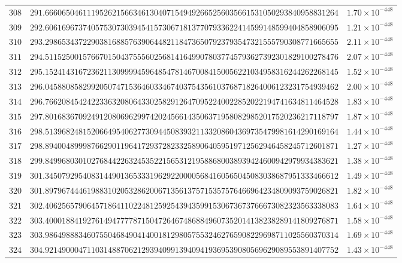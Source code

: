 \documentclass[12pt,reqno]{amsart}
\theoremstyle{remark}
\begin{document}
\begin{longtable}{clc}
$308$ & $291.6660650461119526215663461304071549492665256035661531050293840958831264$ & $1.70\times 10^{-448}$ \\
$309$ & $292.6061696737405753073039454157306718137707933622414599148599404858906095$ & $1.21\times 10^{-448}$ \\
$310$ & $293.2986534372290381688576390644821184736507923793547321555790308771665655$ & $2.11\times 10^{-448}$ \\
$311$ & $294.5115250015766701504375556025681416499078037745793627392301829100278476$ & $2.07\times 10^{-448}$ \\
$312$ & $295.1524143167236211309999459648547814670084150056221034958316244262268145$ & $1.52\times 10^{-448}$ \\
$313$ & $296.0458808582992050747153646033467403754356103768718264006123231754939462$ & $2.00\times 10^{-448}$ \\
$314$ & $296.7662084542422336320806433025829126470952240022852022194741634811464528$ & $1.83\times 10^{-448}$ \\
$315$ & $297.8016836709249120806962997420245661435063719580829852017520236217118797$ & $1.87\times 10^{-448}$ \\
$316$ & $298.5139682481520664954062773094450839321133208604369735479981614290169164$ & $1.44\times 10^{-448}$ \\
$317$ & $298.8940048999876629011964172937282332589064059519712562946458245712601871$ & $1.27\times 10^{-448}$ \\
$318$ & $299.8499680301027684422632453522156531219588680038939424600942979934383621$ & $1.38\times 10^{-448}$ \\
$319$ & $301.3450792954083144901365333196292200005684160565045083038687951333466612$ & $1.49\times 10^{-448}$ \\
$320$ & $301.8979674446198831020532862006713561375715357576466964234809093759026821$ & $1.82\times 10^{-448}$ \\
$321$ & $302.4062565790645718641102248125925439435991530673673766673082323563338083$ & $1.64\times 10^{-448}$ \\
$322$ & $303.4000188419276149477778715047264674868849607352014138238289141809276871$ & $1.58\times 10^{-448}$ \\
$323$ & $303.9864988834607550468490414001812980575532462765908229698711025560370314$ & $1.69\times 10^{-448}$ \\
$324$ & $304.9214900047110314887062129394099139409419369539080569629089553891407752$ & $1.43\times 10^{-448}$ \\

\end{longtable}
\end{document}
